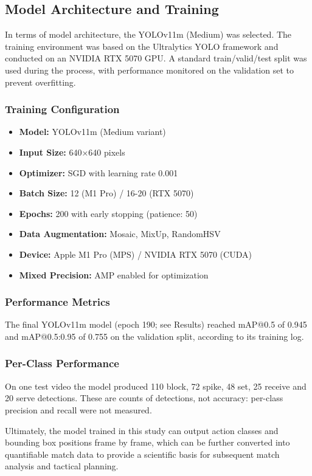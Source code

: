 \documentclass[journal]{IEEEtran}
\begin{document}
\subsection{Model Architecture and Training}
In terms of model architecture, the YOLOv11m (Medium) was selected. The training environment was based on the Ultralytics YOLO framework and conducted on an NVIDIA RTX 5070 GPU. A standard train/valid/test split was used during the process, with performance monitored on the validation set to prevent overfitting.

\subsubsection{Training Configuration}
\begin{itemize}
\item \textbf{Model:} YOLOv11m (Medium variant)
\item \textbf{Input Size:} 640×640 pixels
\item \textbf{Optimizer:} SGD with learning rate 0.001
\item \textbf{Batch Size:} 12 (M1 Pro) / 16-20 (RTX 5070)
\item \textbf{Epochs:} 200 with early stopping (patience: 50)
\item \textbf{Data Augmentation:} Mosaic, MixUp, RandomHSV
\item \textbf{Device:} Apple M1 Pro (MPS) / NVIDIA RTX 5070 (CUDA)
\item \textbf{Mixed Precision:} AMP enabled for optimization
\end{itemize}

\subsubsection{Performance Metrics}
The final YOLOv11m model (epoch 190; see Results) reached mAP@0.5 of 0.945 and mAP@0.5:0.95 of 0.755 on the validation split, according to its training log.

\subsubsection{Per-Class Performance}
On one test video the model produced 110 block, 72 spike, 48 set, 25 receive and 20 serve detections. These are counts of detections, not accuracy: per-class precision and recall were not measured.

Ultimately, the model trained in this study can output action classes and bounding box positions frame by frame, which can be further converted into quantifiable match data to provide a scientific basis for subsequent match analysis and tactical planning.
\end{document}
